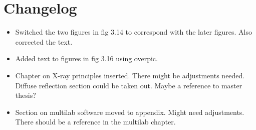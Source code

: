 \chapter{Changelog}

\begin{itemize}
  \item Switched the two figures in fig 3.14 to correspond with the later figures. Also corrected the text.
  \item Added text to figures in fig 3.16 using overpic.
  \item Chapter on X-ray principles inserted. There might be adjustments needed. Diffuse reflection section could be taken out. Maybe a reference to master thesis?
  \item Section on multilab software moved to appendix. Might need adjustments. There should be a reference in the multilab chapter. 
\end{itemize}

